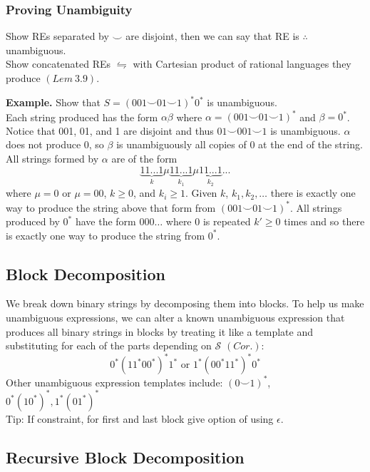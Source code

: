 \documentclass[11pt]{article}
\newenvironment{eg}[1]{
\begin{tcolorbox}[colback = white!15, arc=0pt,outer arc=0pt, colframe = black]
{\color{black} \textbf{Example.} #1} \\[5pt]
}
{
\end{tcolorbox}
}
\newcommand{\nl}{\\[5pt]}
\begin{document}
\subsubsection{Proving Unambiguity}
Show REs separated by $\smile$ are disjoint, then we can say that RE is $\therefore$ unambiguous. \nl
Show concatenated REs $\leftrightharpoons$ with Cartesian product of rational languages they produce $(Lem \: 3.9)$.
\begin{eg}{Show that $S = (001 \smile 01 \smile 1)^*0^*$ is unambiguous.}
Each string produced has the form $\alpha\beta$ where $\alpha = (001 \smile 01 \smile 1)^*$ and $\beta = 0^*$. Notice that 001, 01, and 1 are disjoint and thus $01 \smile 001 \smile 1$ is unambiguous. $\alpha$ does not produce 0, so $\beta$ is unambiguously all copies of $0$ at the end of the string. All strings formed by $\alpha$ are of the form
    $$\underbrace{11...1}_k \mu \underbrace{11...1}_{k_1} \mu \underbrace{11...1}_{k_2}...$$
    where $\mu = 0$ or $\mu = 00$, $k \geq 0$, and $k_i \geq 1$. Given $k$, $k_1, k_2, \dots$ there is exactly one way to produce the string above that form from $(001 \smile 01 \smile 1)^*$. All strings produced by $0^*$ have the form $000\dots$ where $0$ is repeated $k' \geq 0$ times and so there is exactly one way to produce the string from $0^*$. 
\end{eg}

\subsection{Block Decomposition}
We break down binary strings by decomposing them into blocks.
To help us make unambiguous expressions, we can alter a known unambiguous expression that produces all binary strings in blocks by treating it like a template and substituting for each of the parts depending on $\mathcal{S}$ $(Cor. )$:
$$0^* (11^*00^*)^*1^* \text{ or } 1^*(00^*11^*)^*0^*$$
Other unambiguous expression templates include: $(0 \smile 1)^*$, $0^*(10^*)^*, 1^*(01^*)^*$ \nl
Tip: If constraint, for first and last block give option of using $\epsilon$.

\subsection{Recursive Block Decomposition}
\end{document}
